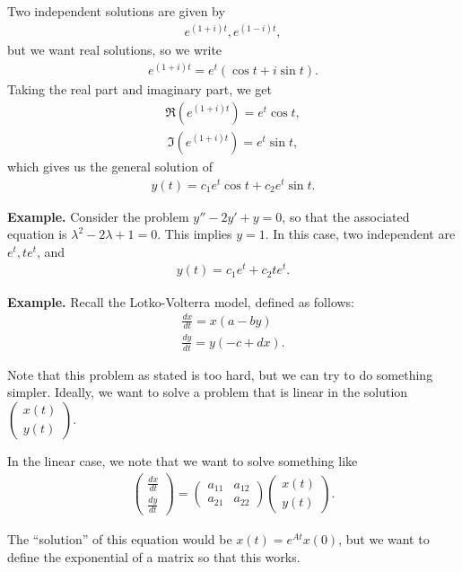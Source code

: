 \documentclass{article}
\newcommand{\mat}[1]{\begin{pmatrix}#1\end{pmatrix}}
\begin{document}
Two independent solutions are given by
\begin{align*}
  e^{(1+i)t}, e^{(1-i)t},
\end{align*}
but we want real solutions, so we write
\begin{align*}
  e^{(1+i)t} = e^t (\cos t + i \sin t).
\end{align*}
Taking the real part and imaginary part, we get
\begin{align*}
  \Re(e^{(1+i)t}) = e^t \cos t,
\end{align*}
\begin{align*}
  \Im(e^{(1+i)t}) = e^t \sin t,
\end{align*}
which gives us the general solution of
\begin{align*}
  y(t) = c_1 e^t \cos t + c_2 e^t \sin t.
\end{align*}

{\bf Example.} Consider the problem $y'' - 2y' + y = 0$, so that the associated equation is $\lambda^2 - 2\lambda + 1 = 0$.  This implies $y = 1$.  In this case, two independent are $e^t, t e^t$, and
\begin{align*}
  y(t) = c_1 e^t + c_2 t e^t.
\end{align*}

{\bf Example.} Recall the Lotko-Volterra model, defined as follows:
\begin{align*}
  \frac{dx}{dt} = x(a - by) \\
  \frac{dy}{dt} = y(-c + dx).
\end{align*}

Note that this problem as stated is too hard, but we can try to do something simpler.  Ideally, we want to solve a problem that is linear in the solution $\mat{x(t) \\ y(t)}$.

In the linear case, we note that we want to solve something like
\begin{align*}
  \mat{\frac{dx}{dt} \\ \frac{dy}{dt}} = \mat{a_{11} & a_{12} \\ a_{21} & a_{22}} \mat{x(t) \\ y(t)}.
\end{align*}

The ``solution'' of this equation would be  $x(t) = e^{At} x(0)$, but we want to define the exponential of a matrix so that this works.
\end{document}
